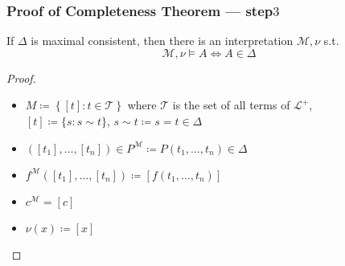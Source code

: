 \documentclass[UTF8,11pt,colorlinks,compress,openany]{beamer}%
\begin{document}
\begin{frame}\frametitle{Proof of Completeness Theorem --- step$3$}
	\begin{lemma}
		If $\Delta$ is maximal consistent, then there is an interpretation $\mathcal{M},\nu$ s.t.
		\[\mathcal{M},\nu\vDash A\iff A\in\Delta\]
	\end{lemma}
	\begin{proof}
		\begin{itemize}
			\item $M\coloneqq \left\{[t]: t\in\mathcal{T}\right\}$ where $\mathcal{T}$ is the set of all terms of $\mathscr{L}^+$,\\
			$[t]\coloneqq \{s: s\sim t\}$, $s\sim t\coloneqq s=t\in\Delta$
			\item $\left([t_1],\dots,[t_n]\right)\in P^{\mathcal{M}}\coloneqq P\left(t_1,\dots,t_n\right)\in\Delta$
			\item $f^{\mathcal{M}}\left([t_1],\dots,[t_n]\right)\coloneqq [f(t_1,\dots,t_n)]$
			\item $c^{\mathcal{M}}=[c]$
			\item $\nu(x)\coloneqq [x]$
		\end{itemize}
	\end{proof}
\end{frame}
\end{document}

